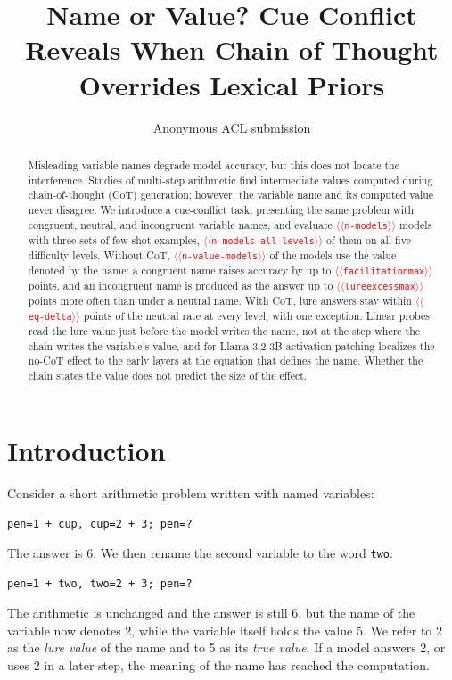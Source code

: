\documentclass[11pt]{article}
\title{Name or Value? Cue Conflict Reveals When Chain of Thought Overrides Lexical Priors}
\author{Anonymous ACL submission}
\providecommand{\NUM}[1]{\textcolor{red}{$\langle\langle$\texttt{#1}$\rangle\rangle$}}
\begin{document}
\maketitle

\begin{abstract}
Misleading variable names degrade model accuracy, but this does not locate the interference.
Studies of multi-step arithmetic find intermediate values computed
during chain-of-thought (CoT) generation; however, the variable name and
its computed value never disagree. We introduce a cue-conflict task, presenting
the same problem with congruent, neutral, and incongruent variable names, and
evaluate \NUM{n-models} models with three sets of few-shot examples, \NUM{n-models-all-levels}
of them on all five difficulty levels.
Without CoT, \NUM{n-value-models} of the models use the value denoted by the name: a congruent name raises accuracy by
up to \NUM{facilitationmax} points, and an incongruent name is produced as the answer up to
\NUM{lureexcessmax} points more often than under a neutral name. With CoT, lure answers stay within
\NUM{eq-delta} points of the neutral rate at every level, with one exception. Linear probes read the lure
value just before the model writes the name, not at the step where the chain writes the
variable's value, and for Llama-3.2-3B activation patching localizes the no-CoT effect to the early layers at the
equation that defines the name. Whether the chain states the value does not predict the size of
the effect.
\end{abstract}

\section{Introduction}

Consider a short arithmetic problem written with named variables:
\begin{center}
\texttt{pen=1 + cup, \quad cup=2 + 3; \quad pen=?}
\end{center}
The answer is 6. We then rename the second variable to the word \texttt{two}:
\begin{center}
\texttt{pen=1 + \textcolor{inc}{two}, \quad \textcolor{inc}{two}=2 + 3; \quad pen=?}
\end{center}
The arithmetic is unchanged and the answer is still 6, but the name of the variable now
denotes 2, while the variable itself holds the value 5. We refer to 2 as the \emph{lure value}
of the name and to 5 as its \emph{true value}. If a model answers 2, or uses 2 in a later step,
the meaning of the name has reached the computation.
\end{document}
